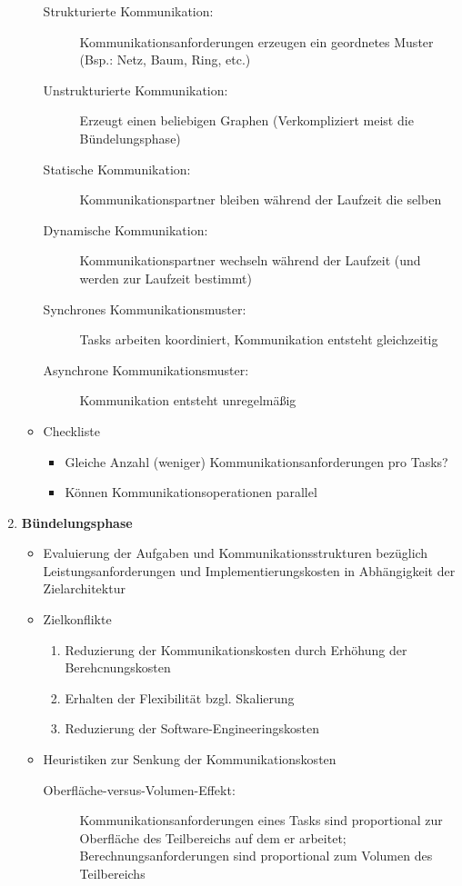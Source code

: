 \begin{enumerate}
\begin{itemize}
\begin{description}
			\item[Strukturierte Kommunikation:] Kommunikationsanforderungen erzeugen ein geordnetes Muster (Bsp.: Netz, Baum, Ring, etc.)
			\item[Unstrukturierte Kommunikation:] Erzeugt einen beliebigen Graphen (Verkompliziert meist die Bündelungsphase)
			\item[Statische Kommunikation:] Kommunikationspartner bleiben während der Laufzeit die selben
			\item[Dynamische Kommunikation:] Kommunikationspartner wechseln während der Laufzeit (und werden zur Laufzeit bestimmt)
			\item[Synchrones Kommunikationsmuster:] Tasks arbeiten koordiniert, Kommunikation entsteht gleichzeitig
			\item[Asynchrone Kommunikationsmuster:] Kommunikation entsteht unregelmäßig
		\end{description}
		\item Checkliste
		\begin{itemize}
			\item Gleiche Anzahl (weniger) Kommunikationsanforderungen pro Tasks?
			\item Können Kommunikationsoperationen parallel 
		\end{itemize}
	\end{itemize}
	\item \textbf{Bündelungsphase}
	\begin{itemize}
		\item Evaluierung der Aufgaben und Kommunikationsstrukturen bezüglich Leistungsanforderungen und Implementierungskosten in Abhängigkeit der Zielarchitektur
		\item Zielkonflikte
		\begin{enumerate}
			\item Reduzierung der Kommunikationskosten durch Erhöhung der Berehcnungskosten
			\item Erhalten der Flexibilität bzgl. Skalierung
			\item Reduzierung der Software-Engineeringskosten
		\end{enumerate}
		\item Heuristiken zur Senkung der Kommunikationskosten
		\begin{description}
			\item[Oberfläche-versus-Volumen-Effekt:] Kommunikationsanforderungen eines Tasks sind proportional zur Oberfläche des Teilbereichs auf dem er arbeitet; Berechnungsanforderungen sind proportional zum Volumen des Teilbereichs

\end{description}
\end{itemize}
\end{enumerate}
